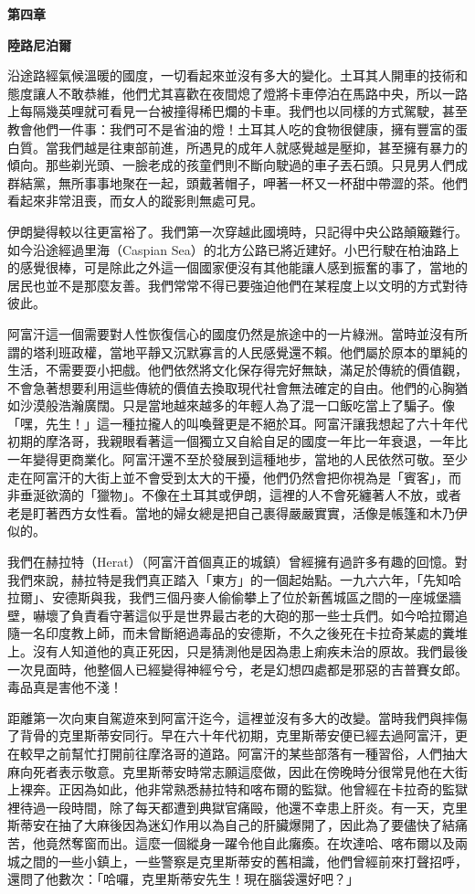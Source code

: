 \textbf{第四章}

\textbf{陸路尼泊爾}

沿途路經氣候溫暖的國度，一切看起來並沒有多大的變化。土耳其人開車的技術和態度讓人不敢恭維，他們尤其喜歡在夜間熄了燈將卡車停泊在馬路中央，所以一路上每隔幾英哩就可看見一台被撞得稀巴爛的卡車。我們也以同樣的方式駕駛，甚至教會他們一件事：我們可不是省油的燈！土耳其人吃的食物很健康，擁有豐富的蛋白質。當我們越是往東部前進，所遇見的成年人就感覺越是壓抑，甚至擁有暴力的傾向。那些剃光頭、一臉老成的孩童們則不斷向駛過的車子丟石頭。只見男人們成群結黨，無所事事地聚在一起，頭戴著帽子，呷著一杯又一杯甜中帶澀的茶。他們看起來非常沮喪，而女人的蹤影則無處可見。

伊朗變得較以往更富裕了。我們第一次穿越此國境時，只記得中央公路顛簸難行。如今沿途經過里海（Caspian
Sea）的北方公路已將近建好。小巴行駛在柏油路上的感覺很棒，可是除此之外這一個國家便沒有其他能讓人感到振奮的事了，當地的居民也並不是那麼友善。我們常常不得已要強迫他們在某程度上以文明的方式對待彼此。

阿富汗這一個需要對人性恢復信心的國度仍然是旅途中的一片綠洲。當時並沒有所謂的塔利班政權，當地平靜又沉默寡言的人民感覺還不賴。他們屬於原本的單純的生活，不需要耍小把戲。他們依然將文化保存得完好無缺，滿足於傳統的價值觀，不會急著想要利用這些傳統的價值去換取現代社會無法確定的自由。他們的心胸猶如沙漠般浩瀚廣闊。只是當地越來越多的年輕人為了混一口飯吃當上了騙子。像「嘿，先生！」這一種拉攏人的叫喚聲更是不絕於耳。阿富汗讓我想起了六十年代初期的摩洛哥，我親眼看著這一個獨立又自給自足的國度一年比一年衰退，一年比一年變得更商業化。阿富汗還不至於發展到這種地步，當地的人民依然可敬。至少走在阿富汗的大街上並不會受到太大的干擾，他們仍然會把你視為是「賓客」，而非垂涎欲滴的「獵物」。不像在土耳其或伊朗，這裡的人不會死纏著人不放，或者老是盯著西方女性看。當地的婦女總是把自己裹得嚴嚴實實，活像是帳篷和木乃伊似的。

我們在赫拉特（Herat）（阿富汗首個真正的城鎮）曾經擁有過許多有趣的回憶。對我們來說，赫拉特是我們真正踏入「東方」的一個起始點。一九六六年，「先知哈拉爾」、安德斯與我，我們三個丹麥人偷偷攀上了位於新舊城區之間的一座城堡牆壁，嚇壞了負責看守著這似乎是世界最古老的大砲的那一些士兵們。如今哈拉爾追隨一名印度教上師，而未曾斷絕過毒品的安德斯，不久之後死在卡拉奇某處的糞堆上。沒有人知道他的真正死因，只是猜測他是因為患上痢疾未治的原故。我們最後一次見面時，他整個人已經變得神經兮兮，老是幻想四處都是邪惡的吉普賽女郎。毒品真是害他不淺！

距離第一次向東自駕遊來到阿富汗迄今，這裡並沒有多大的改變。當時我們與摔傷了背骨的克里斯蒂安同行。早在六十年代初期，克里斯蒂安便已經去過阿富汗，更在較早之前幫忙打開前往摩洛哥的道路。阿富汗的某些部落有一種習俗，人們抽大麻向死者表示敬意。克里斯蒂安時常志願這麼做，因此在傍晚時分很常見他在大街上裸奔。正因為如此，他非常熟悉赫拉特和喀布爾的監獄。他曾經在卡拉奇的監獄裡待過一段時間，除了每天都遭到典獄官痛毆，他還不幸患上肝炎。有一天，克里斯蒂安在抽了大麻後因為迷幻作用以為自己的肝臟爆開了，因此為了要儘快了結痛苦，他竟然奪窗而出。這麼一個縱身一躍令他自此癱瘓。在坎達哈、喀布爾以及兩城之間的一些小鎮上，一些警察是克里斯蒂安的舊相識，他們曾經前來打聲招呼，還問了他數次：「哈囉，克里斯蒂安先生！現在腦袋還好吧？」

